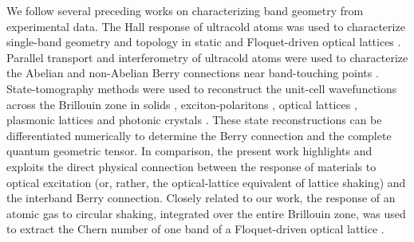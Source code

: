 \documentclass[superscriptaddress, reprint, amsmath, amssymb, aps, prl]{revtex4-2}
\begin{document}
We follow several preceding works on characterizing band geometry  from experimental data. The Hall response of ultracold atoms was used to characterize single-band geometry and topology in static and Floquet-driven optical lattices \cite{jotz14haldane, aide15chern,wint20floquet}.  Parallel transport and interferometry of ultracold atoms were used to characterize the Abelian and non-Abelian Berry connections near band-touching points \cite{duca15ab,brow22singularity}. State-tomography methods were used to reconstruct the unit-cell wavefunctions across the Brillouin zone in solids \cite{kim25qmt}, exciton-polaritons \cite{gianfrate_measurement_2020}, optical lattices \cite{flas16Berry,li16wilson,yi23qgt}, plasmonic lattices \cite{cuerda_observation_2024} and photonic crystals \cite{guil25quantumgeometry}.  These state reconstructions can be differentiated numerically to determine the Berry connection and the complete quantum geometric tensor. In comparison, the present work highlights and exploits the direct physical connection between the response of materials to optical excitation (or, rather, the optical-lattice equivalent of lattice shaking) and the interband Berry connection. Closely related to our work, the response of an atomic gas to circular shaking, integrated over the entire Brillouin zone, was used to extract the Chern number of one band of a Floquet-driven optical lattice \cite{tran_probing_2017, asteria_measuring_2019}.
\end{document}
